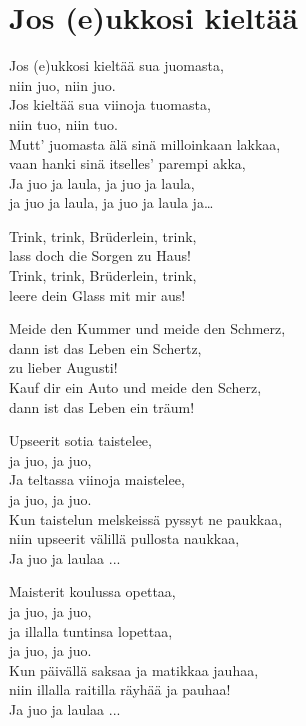 \section{Jos (e)ukkosi kieltää}

Jos (e)ukkosi kieltää sua juomasta,\\
niin juo, niin juo.\\
Jos kieltää sua viinoja tuomasta,\\
niin tuo, niin tuo.\\
Mutt' juomasta älä sinä milloinkaan lakkaa,\\
vaan hanki sinä itselles' parempi akka,\\
Ja juo ja laula, ja juo ja laula,\\
ja juo ja laula, ja juo ja laula ja…

Trink, trink, Brüderlein, trink,\\
lass doch die Sorgen zu Haus!\\
Trink, trink, Brüderlein, trink,\\
leere dein Glass mit mir aus!

Meide den Kummer und meide den Schmerz,\\
dann ist das Leben ein Schertz,\\
zu lieber Augusti!\\
Kauf dir ein Auto und meide den Scherz,\\
dann ist das Leben ein träum!

Upseerit sotia taistelee,\\
ja juo, ja juo,\\
Ja teltassa viinoja maistelee,\\
ja juo, ja juo.\\
Kun taistelun melskeissä pyssyt ne paukkaa,\\
niin upseerit välillä pullosta naukkaa,\\
Ja juo ja laulaa ...

Maisterit koulussa opettaa,\\
ja juo, ja juo,\\
ja illalla tuntinsa lopettaa,\\
ja juo, ja juo.\\
Kun päivällä saksaa ja matikkaa jauhaa,\\
niin illalla raitilla räyhää ja pauhaa!\\
Ja juo ja laulaa ...